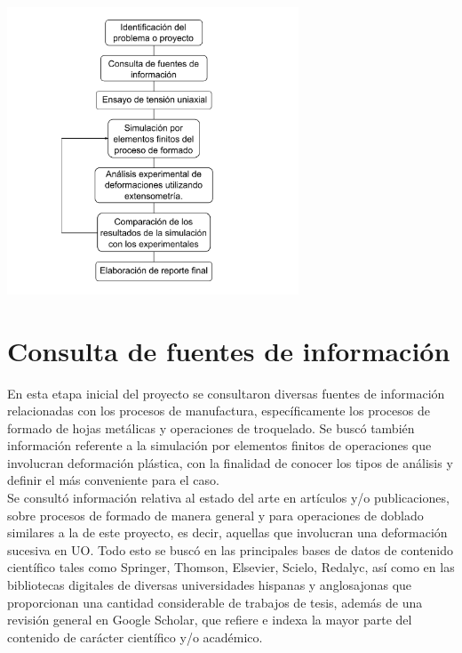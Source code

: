 \begin{center}
\includegraphics[width=0.65\textwidth]{src/ch3/diagrama_metodologia.pdf}
\label{fig:diagrama_metodologia}
\end{center}

\section{Consulta de fuentes de información}

En esta etapa inicial del proyecto se consultaron diversas fuentes de información 
relacionadas con los procesos de manufactura, específicamente los procesos 
de formado de hojas metálicas y operaciones de troquelado. Se buscó también información 
referente a la simulación por elementos finitos de operaciones que involucran 
deformación plástica, con la finalidad de conocer los tipos de análisis y definir 
el más conveniente para el caso. \\

Se consultó información relativa al estado del arte en artículos y/o publicaciones, 
sobre procesos de formado de manera general y para operaciones de doblado similares a la 
de este proyecto, es decir, aquellas que involucran una deformación sucesiva en UO. 
Todo esto se buscó en las principales bases de datos de contenido científico tales 
como Springer, Thomson, Elsevier, Scielo, Redalyc, así como en las bibliotecas 
digitales de diversas universidades hispanas y anglosajonas que proporcionan una 
cantidad considerable de trabajos de tesis, además de una revisión general en 
Google Scholar, que refiere e indexa la mayor parte del contenido de carácter científico 
y/o académico.

